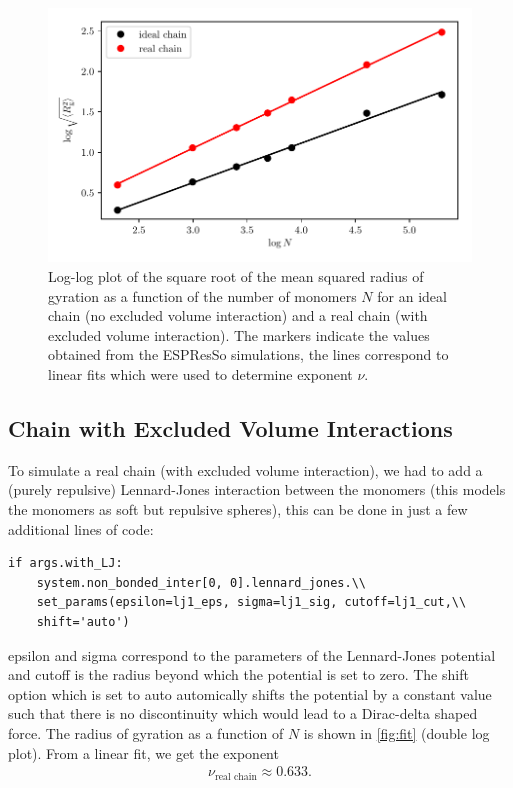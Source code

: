 \documentclass[a4paper,10pt,bibtotoc]{scrartcl}
\begin{document}
\begin{figure}[h]
\centering
\includegraphics[width=\textwidth]{fit.pdf}
\caption{Log-log plot of the square root of the mean squared radius of gyration as a function of the number of monomers $N$ for an ideal chain (no excluded volume interaction) and a real chain (with excluded volume interaction). The markers indicate the values obtained from the ESPResSo simulations, the lines correspond to linear fits which were used to determine exponent $\nu$.}
\label{fig:fit}
\end{figure}

\subsection{Chain with Excluded Volume Interactions}
To simulate a real chain (with excluded volume interaction), we had to add a (purely repulsive) Lennard-Jones interaction between the monomers (this models the monomers as soft but repulsive spheres), this can be done in just a few additional lines of code:
\begin{lstlisting}
if args.with_LJ:
    system.non_bonded_inter[0, 0].lennard_jones.\\
    set_params(epsilon=lj1_eps, sigma=lj1_sig, cutoff=lj1_cut,\\
    shift='auto')
\end{lstlisting}
epsilon and sigma correspond to the parameters of the Lennard-Jones potential and cutoff is the radius beyond which the potential is set to zero. The shift option which is set to auto automically shifts the potential by a constant value such that there is no discontinuity which would lead to a Dirac-delta shaped force. The radius of gyration as a function of $N$ is shown in \autoref{fig:fit} (double log plot). From a linear fit, we get the exponent
\begin{align}
 \nu_\text{real chain} \approx 0.633.
\end{align}
\end{document}
